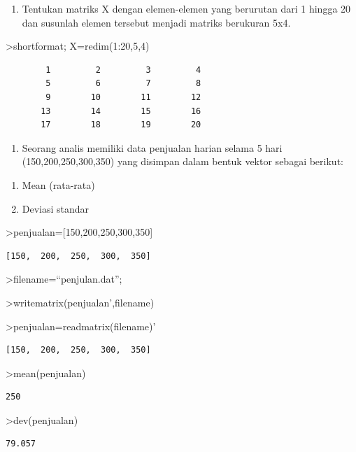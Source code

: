 \documentclass[
]{book}
\providecommand{\tightlist}{%
  \setlength{\itemsep}{0pt}\setlength{\parskip}{0pt}}
\begin{document}
\begin{enumerate}
\def\labelenumi{\arabic{enumi}.}
\setcounter{enumi}{1}
\tightlist
\item
  Tentukan matriks X dengan elemen-elemen yang berurutan dari 1 hingga 20 dan susunlah elemen tersebut menjadi matriks berukuran 5x4.
\end{enumerate}

\textgreater shortformat; X=redim(1:20,5,4)

\begin{verbatim}
        1         2         3         4 
        5         6         7         8 
        9        10        11        12 
       13        14        15        16 
       17        18        19        20 
\end{verbatim}

\begin{enumerate}
\def\labelenumi{\arabic{enumi}.}
\setcounter{enumi}{2}
\tightlist
\item
  Seorang analis memiliki data penjualan harian selama 5 hari (150,200,250,300,350) yang disimpan dalam bentuk vektor sebagai berikut:
\end{enumerate}

\begin{enumerate}
\def\labelenumi{\alph{enumi}.}
\item
  Mean (rata-rata)
\item
  Deviasi standar
\end{enumerate}

\textgreater penjualan={[}150,200,250,300,350{]}

\begin{verbatim}
[150,  200,  250,  300,  350]
\end{verbatim}

\textgreater filename=``penjulan.dat'';

\textgreater writematrix(penjualan',filename)

\textgreater penjualan=readmatrix(filename)'

\begin{verbatim}
[150,  200,  250,  300,  350]
\end{verbatim}

\textgreater mean(penjualan)

\begin{verbatim}
250
\end{verbatim}

\textgreater dev(penjualan)

\begin{verbatim}
79.057
\end{verbatim}
\end{document}
